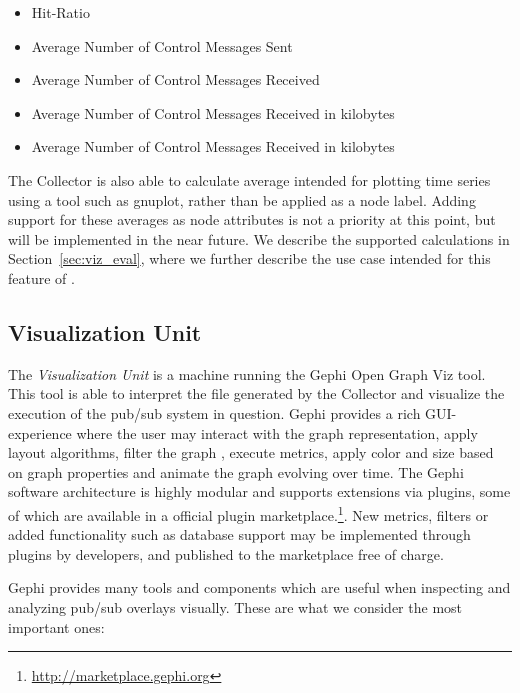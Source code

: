 \begin{itemize}
    \item Hit-Ratio
    \item Average Number of Control Messages Sent
    \item Average Number of Control Messages Received
    \item Average Number of Control Messages Received in kilobytes
    \item Average Number of Control Messages Received in kilobytes
\end{itemize}

The Collector is also able to calculate average intended for plotting
time series using a tool such as gnuplot, rather than be applied as a
node label. Adding support for these averages as node attributes is not
a priority at this point, but will be implemented in the near future. We
describe the supported calculations in Section~\ref{sec:viz_eval}, where
we further describe the use case intended for this feature of \demo.

\subsection{Visualization Unit}
\label{sec:viz_unit}

The \emph{Visualization Unit} is a machine running the Gephi Open Graph
Viz tool. This tool is able to interpret the \gexf{} file generated by
the Collector and visualize the execution of the pub/sub system in
question.  Gephi provides a rich GUI-experience where the user may
interact with the graph representation, apply layout algorithms, filter
the graph , execute metrics, apply color and size based on graph
properties and animate the graph evolving over time.  The Gephi software
architecture is highly modular and supports extensions via plugins, some
of which are available in a official plugin
marketplace.\footnote{\url{http://marketplace.gephi.org}}. New metrics,
filters or added functionality such as database support may be
implemented through plugins by developers, and published to the
marketplace free of charge.

Gephi provides many tools and components which are useful when
inspecting and analyzing pub/sub overlays visually. These are what we
consider the most important ones:

